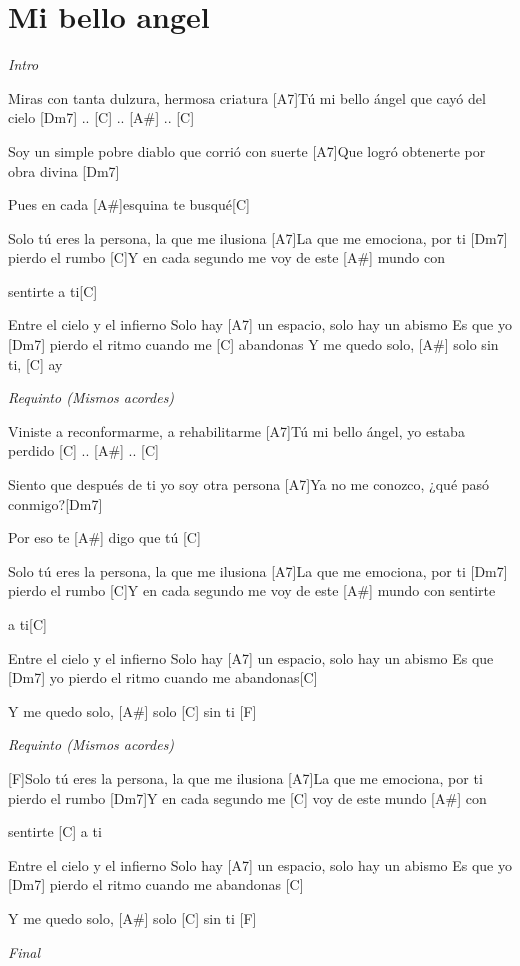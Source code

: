 \section{Mi bello angel}

\noindent
\vspace{1cm}

\begin{guitar}
	\begin{multicols}{2}

		\textit{Intro}
		\par
		[F]Miras con tanta dulzura, hermosa criatura
		[A7]Tú mi bello ángel que cayó del cielo [Dm7] .. [C] .. [A#] .. [C] \par
		[F]Soy un simple pobre diablo que corrió con suerte
		[A7]Que logró obtenerte por obra divina [Dm7] \par
		[C]Pues en cada [A#]esquina te busqué[C] \par
		[F]Solo tú eres la persona, la que me ilusiona
		[A7]La que me emociona, por ti [Dm7] pierdo el rumbo
		[C]Y en cada segundo me voy de este [A#] mundo con \par sentirte a ti[C] \par
		[F]Entre el cielo y el infierno
		Solo hay [A7] un espacio, solo hay un abismo
		Es que yo [Dm7] pierdo el ritmo cuando me [C] abandonas
		Y me quedo solo, [A#] solo sin ti, [C] ay\par
		\par
		\textit{Requinto (Mismos acordes)}
		\par
		[F]Viniste a reconformarme, a rehabilitarme
		[A7]Tú mi bello ángel, yo estaba perdido [C] .. [A#] .. [C] \par
		[F]Siento que después de ti yo soy otra persona
		[A7]Ya no me conozco, ¿qué pasó conmigo?[Dm7] \par
		[C]Por eso te [A#] digo que tú [C] \par
		[F]Solo tú eres la persona, la que me ilusiona
		[A7]La que me emociona, por ti [Dm7] pierdo el rumbo
		[C]Y en cada segundo me voy de este [A#] mundo con sentirte \par a ti[C] \par
		[F]Entre el cielo y el infierno
		Solo hay [A7] un espacio, solo hay un abismo
		Es que [Dm7] yo pierdo el ritmo cuando me abandonas[C] \par
		Y me quedo solo, [A#] solo [C] sin ti [F] \par 
		\par
		\textit{Requinto (Mismos acordes)}

		[F]Solo tú eres la persona, la que me ilusiona
		[A7]La que me emociona, por ti pierdo el rumbo
		[Dm7]Y en cada segundo me [C] voy de este mundo [A#] con \par sentirte [C] a ti  \par
		[F]Entre el cielo y el infierno
		Solo hay [A7] un espacio, solo hay un abismo
		Es que yo [Dm7] pierdo el ritmo cuando me abandonas [C] \par
		Y me quedo solo, [A#] solo [C] sin ti [F] \par
		\par
		\textit{Final}
	\end{multicols}
\end{guitar}
